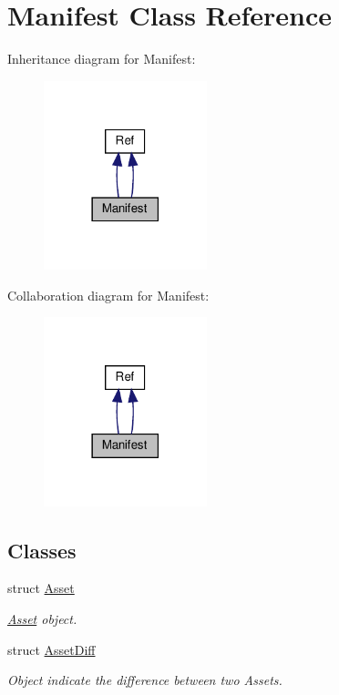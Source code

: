 \hypertarget{classManifest}{}\section{Manifest Class Reference}
\label{classManifest}


Inheritance diagram for Manifest\+:
\nopagebreak
\begin{figure}[H]
\begin{center}
\leavevmode
\includegraphics[width=134pt]{classManifest__inherit__graph}
\end{center}
\end{figure}


Collaboration diagram for Manifest\+:
\nopagebreak
\begin{figure}[H]
\begin{center}
\leavevmode
\includegraphics[width=134pt]{classManifest__coll__graph}
\end{center}
\end{figure}
\subsection*{Classes}
\begin{DoxyCompactItemize}
\item 
struct \hyperlink{structManifest_1_1Asset}{Asset}
\begin{DoxyCompactList}\small\item\em \hyperlink{structManifest_1_1Asset}{Asset} object. \end{DoxyCompactList}\item 
struct \hyperlink{structManifest_1_1AssetDiff}{Asset\+Diff}
\begin{DoxyCompactList}\small\item\em Object indicate the difference between two Assets. \end{DoxyCompactList}\end{DoxyCompactItemize}
